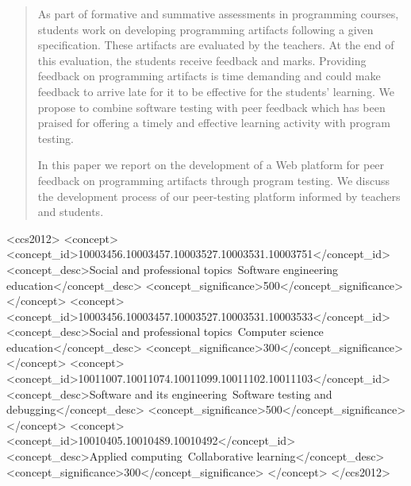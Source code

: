 \documentclass[sigplan,10pt,review]{acmart}\settopmatter{printfolios=true}
\begin{document}


\begin{abstract}
  As part of formative and summative assessments in programming
  courses, students work on developing programming artifacts following
  a given specification. These artifacts are evaluated by the
  teachers. At the end of this evaluation, the students receive
  feedback and marks. Providing feedback on programming artifacts is
  time demanding and could make feedback to arrive late for it to be
  effective for the students' learning. We propose to combine software
  testing with peer feedback which has been praised for offering a
  timely and effective learning activity with program testing.

  In this paper we report on the development of a Web platform for
  peer feedback on programming artifacts through program testing. We
  discuss the development process of our peer-testing platform
  informed by teachers and students.
\end{abstract}

\begin{CCSXML}
<ccs2012>
<concept>
<concept_id>10003456.10003457.10003527.10003531.10003751</concept_id>
<concept_desc>Social and professional topics~Software engineering education</concept_desc>
<concept_significance>500</concept_significance>
</concept>
<concept>
<concept_id>10003456.10003457.10003527.10003531.10003533</concept_id>
<concept_desc>Social and professional topics~Computer science education</concept_desc>
<concept_significance>300</concept_significance>
</concept>
<concept>
<concept_id>10011007.10011074.10011099.10011102.10011103</concept_id>
<concept_desc>Software and its engineering~Software testing and debugging</concept_desc>
<concept_significance>500</concept_significance>
</concept>
<concept>
<concept_id>10010405.10010489.10010492</concept_id>
<concept_desc>Applied computing~Collaborative learning</concept_desc>
<concept_significance>300</concept_significance>
</concept>
</ccs2012>
\end{CCSXML}
\end{document}

